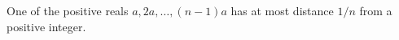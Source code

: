 One of the positive reals $a, 2a, \ldots, (n - 1)a$ has at most distance $1/n$ from a positive integer.
